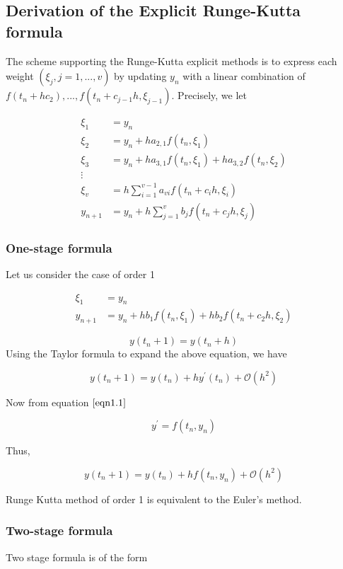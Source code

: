 \documentclass[12pt,a4paper]{article}
\begin{document}
\subsection{Derivation of the Explicit Runge-Kutta formula}

The scheme supporting the Runge-Kutta explicit methods is to express each weight $(\xi_j, j=1,...,v)$  by updating $y_n$ with a linear combination of $ f(t_n + hc_2),...,f(t_n+c_{j-1}h,\xi_{j-1}).$ Precisely, we let

\begin{align*}
\xi_1 &= y_n \\
\xi_2 &= y_n + ha_{2,1}f(t_n,\xi_1) \\
\xi_3 &= y_n + ha_{3,1}f(t_n,\xi_1)+ha_{3,2}f(t_n,\xi_2)\\\vdots \\
\xi_v &= h \sum_{i=1}^{v-1}a_{vi}f(t_n + c_ih , \xi_i ) \\
y_{n+1} &= y_n + h \sum_{j=1}^{v}b_jf(t_n + c_jh , \xi_j )
\end{align*}

\subsubsection{One-stage formula}

Let us consider the case of order 1

\begin{align*}
\xi_1 &= y_n \\
y_{n+1} &= y_n + hb_1f(t_n, \xi_1) + hb_2f(t_n + c_2h , \xi_2)
\end{align*}
 
$$y(t_n + 1) = y(t_n + h)$$
\noindent
Using the Taylor formula to expand the above equation, we have

$$y(t_n + 1) = y(t_n)+ hy^\prime (t_n) + \mathcal{O}(h^2) $$

Now from equation $\ref{eqn1.1}$

$$y^\prime = f(t_n, y_n)$$

Thus,
 
$$ y(t_n + 1) = y(t_n)+ h f(t_n, y_n) + \mathcal{O}(h^2)$$

\noindent
Runge Kutta method of order 1 is equivalent to the Euler's method.

\subsubsection{Two-stage formula}
Two stage formula is of the form
\end{document}

